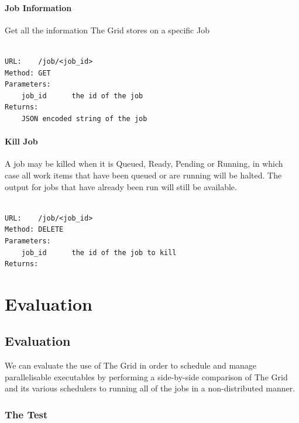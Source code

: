 \subsection{Job Information}
\label{jobinformation}

Get all the information The Grid stores on a specific Job

\begin{adjustwidth}{2.5em}{2.5em}
\begin{verbatim}

URL:    /job/<job_id>
Method: GET
Parameters:
    job_id      the id of the job
Returns:    
    JSON encoded string of the job

\end{verbatim}
\end{adjustwidth}

\subsection{Kill Job}
\label{killjob}

A job may be killed when it is Queued, Ready, Pending or Running, in which case all work items that have been queued or are running will be halted. The output for jobs that have already been run will still be available.

\begin{adjustwidth}{2.5em}{2.5em}
\begin{verbatim}

URL:    /job/<job_id>
Method: DELETE
Parameters: 
    job_id      the id of the job to kill
Returns:

\end{verbatim}
\end{adjustwidth}

\part{Evaluation}
\label{evaluation}

\chapter{Evaluation}
\label{evaluation}

We can evaluate the use of The Grid in order to schedule and manage parallelisable executables by performing a side-by-side comparison of The Grid and its various schedulers to running all of the jobs in a non-distributed manner.

\section{The Test}
\label{thetest}

